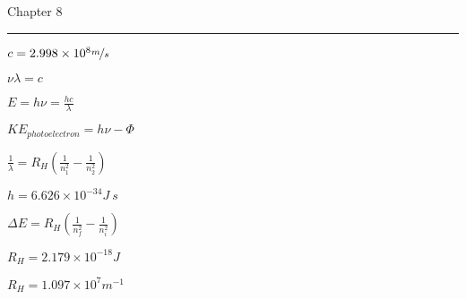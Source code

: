 \documentclass[12pt, letterpaper]{memoir}
\begin{document}
  {\large Chapter 8}

  \rule[1em]{\linewidth}{.1pt}
   
	\begin{minipage}{0.5\linewidth}
	  $c=2.998\times10^8\nicefrac{m}{s}$	

		$\nu\lambda=c$	

    $E=h\nu=\frac{hc}{\lambda}$

    $KE_{photoelectron}=h\nu-\Phi$

    $\frac{1}{\lambda} = R_H\left(\frac{1}{n_1^2}-\frac{1}{n_2^2}\right)$
	\end{minipage}
	\begin{minipage}{0.5\linewidth}

    $h=6.626\times10^{-34}J~s$
    
    $\Delta E = R_H\left(\frac{1}{n_f^2}-\frac{1}{n_i^2}\right)$

    $R_H = 2.179\times10^{-18}J$ 

    $R_H = 1.097\times10^7m^{-1}$
	\end{minipage}
\end{document}
